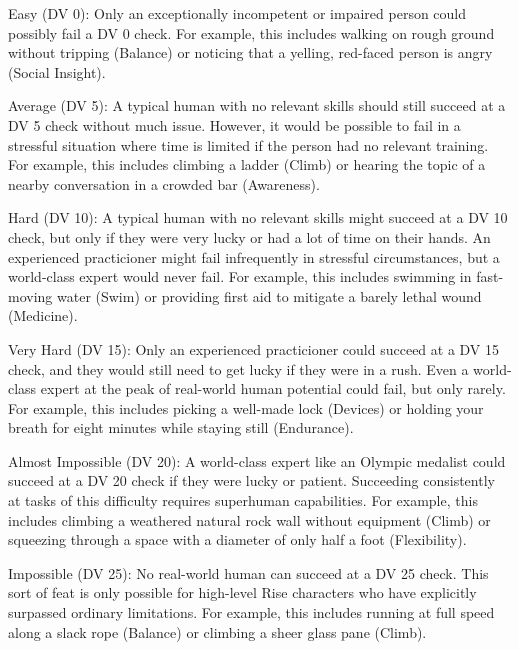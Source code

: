     \begin{raggeditemize}
      \item Easy (DV 0): Only an exceptionally incompetent or impaired person could possibly fail a DV 0 check. For example, this includes walking on rough ground without tripping (Balance) or noticing that a yelling, red-faced person is angry (Social Insight).
      \item Average (DV 5): A typical human with no relevant skills should still succeed at a DV 5 check without much issue. However, it would be possible to fail in a stressful situation where time is limited if the person had no relevant training. For example, this includes climbing a ladder (Climb) or hearing the topic of a nearby conversation in a crowded bar (Awareness).
      \item Hard (DV 10): A typical human with no relevant skills might succeed at a DV 10 check, but only if they were very lucky or had a lot of time on their hands. An experienced practicioner might fail infrequently in stressful circumstances, but a world-class expert would never fail. For example, this includes swimming in fast-moving water (Swim) or providing first aid to mitigate a barely lethal wound (Medicine).
      \item Very Hard (DV 15): Only an experienced practicioner could succeed at a DV 15 check, and they would still need to get lucky if they were in a rush. Even a world-class expert at the peak of real-world human potential could fail, but only rarely. For example, this includes picking a well-made lock (Devices) or holding your breath for eight minutes while staying still (Endurance).
      \item Almost Impossible (DV 20): A world-class expert like an Olympic medalist could succeed at a DV 20 check if they were lucky or patient. Succeeding consistently at tasks of this difficulty requires superhuman capabilities. For example, this includes climbing a weathered natural rock wall without equipment (Climb) or squeezing through a space with a diameter of only half a foot (Flexibility).
      \item Impossible (DV 25\add): No real-world human can succeed at a DV 25 check. This sort of feat is only possible for high-level Rise characters who have explicitly surpassed ordinary limitations. For example, this includes running at full speed along a slack rope (Balance) or climbing a sheer glass pane (Climb).
    \end{raggeditemize}

